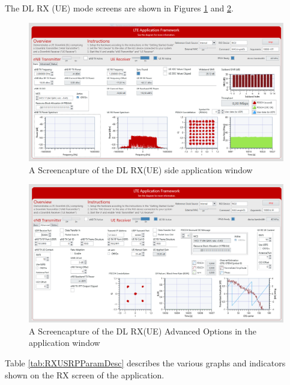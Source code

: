 The DL RX (UE) mode screens are shown in Figures \ref{fig:DLRXScreen} and \ref{fig:DLRXAdvScreen}.

\begin{figure}[H]
    \centering
    \includegraphics[width=\linewidth]{images/SISORXEdited.png}
    \caption{A Screencapture of the DL RX(UE) side application window}
    \label{fig:DLRXScreen}
\end{figure}

\begin{figure}[H]
    \centering
    \includegraphics[width=\linewidth]{images/SISORXADVEdited.png}
    \caption{A Screencapture of the DL RX(UE) Advanced Options in the application window}
    \label{fig:DLRXAdvScreen}
\end{figure}

Table \ref{tab:RXUSRPParamDesc} describes the various graphs and indicators shown on the RX screen of the application.

